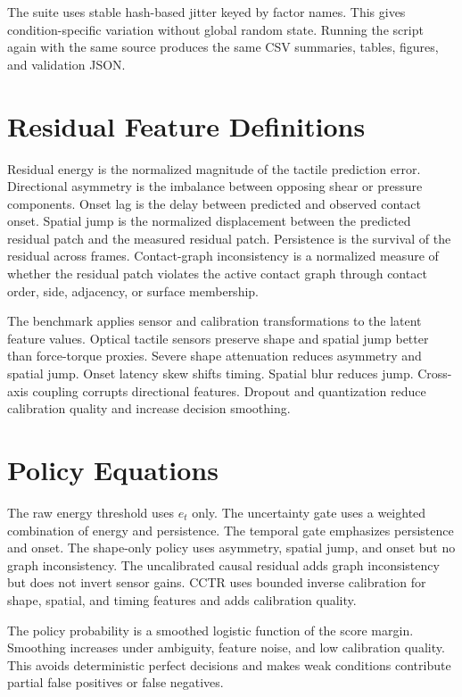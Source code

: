 \documentclass{article}
\newcommand{\method}{CCTR}
\begin{document}
The suite uses stable hash-based jitter keyed by factor names. This gives condition-specific variation without global random state. Running the script again with the same source produces the same CSV summaries, tables, figures, and validation JSON.

\section{Residual Feature Definitions}

Residual energy is the normalized magnitude of the tactile prediction error. Directional asymmetry is the imbalance between opposing shear or pressure components. Onset lag is the delay between predicted and observed contact onset. Spatial jump is the normalized displacement between the predicted residual patch and the measured residual patch. Persistence is the survival of the residual across frames. Contact-graph inconsistency is a normalized measure of whether the residual patch violates the active contact graph through contact order, side, adjacency, or surface membership.

The benchmark applies sensor and calibration transformations to the latent feature values. Optical tactile sensors preserve shape and spatial jump better than force-torque proxies. Severe shape attenuation reduces asymmetry and spatial jump. Onset latency skew shifts timing. Spatial blur reduces jump. Cross-axis coupling corrupts directional features. Dropout and quantization reduce calibration quality and increase decision smoothing.

\section{Policy Equations}

The raw energy threshold uses $e_t$ only. The uncertainty gate uses a weighted combination of energy and persistence. The temporal gate emphasizes persistence and onset. The shape-only policy uses asymmetry, spatial jump, and onset but no graph inconsistency. The uncalibrated causal residual adds graph inconsistency but does not invert sensor gains. \method{} uses bounded inverse calibration for shape, spatial, and timing features and adds calibration quality.

The policy probability is a smoothed logistic function of the score margin. Smoothing increases under ambiguity, feature noise, and low calibration quality. This avoids deterministic perfect decisions and makes weak conditions contribute partial false positives or false negatives.
\end{document}
